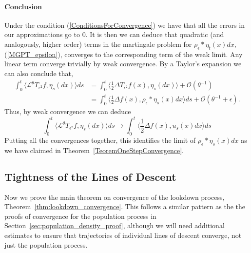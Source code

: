 \documentclass[12pt]{article}
\begin{document}
\paragraph{Conclusion}
Under the condition (\ref{ConditionsForConvergence}) we have that all the errors in our approximations go to $0$. It is then we can deduce that quadratic (and analogously, higher order) terms in the martingale problem for $\rho_\epsilon*\eta_t(x)dx$, (\ref{MGPT_epsilon}), converges to the corresponding term of the weak limit. Any linear term converge trivially by weak convergence. By a Taylor's expansion we can also conclude that,
\begin{align*}
\int_0^t \langle \mathcal{L}^\theta T_{\epsilon^2} f, \eta_s(dx)\rangle ds &= \int_0^t \langle \frac{1}{2} \Delta T_{\epsilon^2} f(x), \eta_s(dx) \rangle + \mathcal{O}(\theta^{-1}) 
\\ &= \int_0^t \langle \frac{1}{2} \Delta f(x), \rho_\epsilon* \eta_s(x) dx \rangle ds + \mathcal{O}(\theta^{-1} + \epsilon).
\end{align*}
Thus, by weak convergence we can deduce
\[ \int_0^t \langle \mathcal{L}^\theta T_{\epsilon^2} f, \eta_s(dx)\rangle ds \rightarrow \int_0^t \langle \frac{1}{2} \Delta f(x), u_s(x) dx \rangle ds \]
Putting all the convergences together, this identifies the limit of $\rho_\epsilon*\eta_s(x)dx$ as we have claimed in Theorem~\ref{TeoremOneStepConvergence}.





\subsection{Tightness of the Lines of Descent}
    \label{sec:lookdown_convergence}

Now we prove the main theorem on convergence of the lookdown process, 
Theorem~\ref{thm:lookdown_convergence}.
This follows a similar pattern as the the proofs of convergence for the population process
in Section~\ref{sec:population_density_proof},
although we will need additional estimates to ensure that
trajectories of individual lines of descent converge,
not just the population process.
\end{document}
